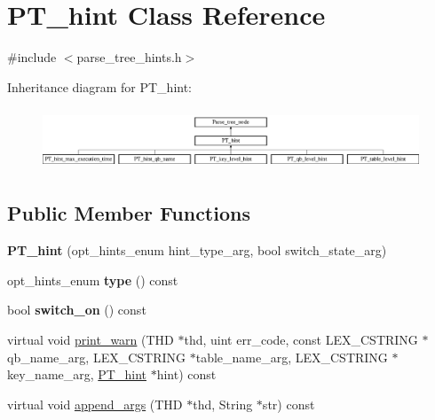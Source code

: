 \hypertarget{classPT__hint}{}\section{P\+T\+\_\+hint Class Reference}
\label{classPT__hint}


{\ttfamily \#include $<$parse\+\_\+tree\+\_\+hints.\+h$>$}

Inheritance diagram for P\+T\+\_\+hint\+:\begin{figure}[H]
\begin{center}
\leavevmode
\includegraphics[height=1.856354cm]{classPT__hint}
\end{center}
\end{figure}
\subsection*{Public Member Functions}
\begin{DoxyCompactItemize}
\item 
\mbox{\label{classPT__hint_a2a524a425b2f915c04c798b33bb95a93}} 
{\bfseries P\+T\+\_\+hint} (opt\+\_\+hints\+\_\+enum hint\+\_\+type\+\_\+arg, bool switch\+\_\+state\+\_\+arg)
\item 
\mbox{\label{classPT__hint_ac52f17a452fc96eb770a5c85408136e8}} 
opt\+\_\+hints\+\_\+enum {\bfseries type} () const
\item 
\mbox{\label{classPT__hint_a8101ba50ba356579e681ca3a22e12a03}} 
bool {\bfseries switch\+\_\+on} () const
\item 
virtual void \mbox{\hyperlink{classPT__hint_a42634c81732506b8b11eeb9c93ba590f}{print\+\_\+warn}} (T\+HD $\ast$thd, uint err\+\_\+code, const L\+E\+X\+\_\+\+C\+S\+T\+R\+I\+NG $\ast$qb\+\_\+name\+\_\+arg, L\+E\+X\+\_\+\+C\+S\+T\+R\+I\+NG $\ast$table\+\_\+name\+\_\+arg, L\+E\+X\+\_\+\+C\+S\+T\+R\+I\+NG $\ast$key\+\_\+name\+\_\+arg, \mbox{\hyperlink{classPT__hint}{P\+T\+\_\+hint}} $\ast$hint) const
\item 
virtual void \mbox{\hyperlink{classPT__hint_afd39b4eeed47d9b1790f12c144aece7d}{append\+\_\+args}} (T\+HD $\ast$thd, String $\ast$str) const
\end{DoxyCompactItemize}
